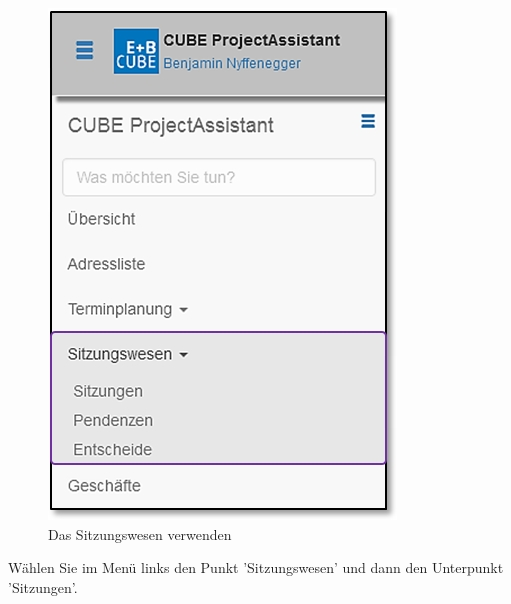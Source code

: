 \begin{figure}   %
  \vspace{-35pt}      %
  \begin{center}
    \includegraphics[width=1\linewidth]{../chapters/05_Sitzungswesen/pictures/5-1_Menu_Sitzungswesen.jpg}
  \end{center}
  \vspace{-20pt}
  \caption{Das Sitzungswesen verwenden}
  \vspace{-10pt}
\end{figure}

Wählen Sie im Menü links den Punkt 'Sitzungswesen' und dann den Unterpunkt 'Sitzungen'.

\vspace{5cm}

